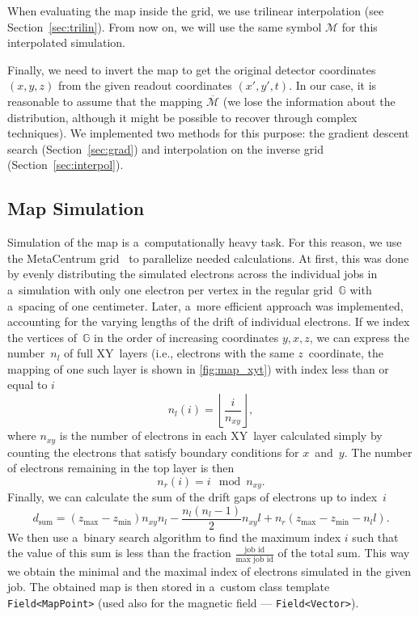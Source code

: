 		When evaluating the map inside the grid, we use trilinear interpolation (see Section~\ref{sec:trilin}). From now on, we will use the same symbol $\mathcal{M}$ for this interpolated simulation.
		
		Finally, we need to invert the map to get the original detector coordinates $(x,y,z)$ from the given readout coordinates $(x',y',t)$. In our case, it is reasonable to assume that the mapping $\overline{\mathcal{M}}$ (we lose the information about the distribution, although it might be possible to recover through complex techniques). We implemented two methods for this purpose: the gradient descent search (Section~\ref{sec:grad}) and interpolation on the inverse grid (Section~\ref{sec:interpol}).
		
		\subsection{Map Simulation}
			Simulation of the map is a~computationally heavy task. For this reason, we use the MetaCentrum grid~\cite{metacentrum} to parallelize needed calculations. At first, this was done by evenly distributing the simulated electrons across the individual jobs in a~simulation with only one electron per vertex in the regular grid~$\mathbb{G}$ with a~spacing of one centimeter. Later, a~more efficient approach was implemented, accounting for the varying lengths of the drift of individual electrons. If we index the vertices of~$\mathbb{G}$ in the order of increasing coordinates $y,x,z$, we can express the number~$n_l$ of full XY~layers (i.e., electrons with the same $z$~coordinate, the mapping of one such layer is shown in \cref{fig:map_xyt}) with index less than or equal to $i$
				\begin{equation}
					n_l(i) = \left\lfloor\frac{i}{n_{xy}}\right\rfloor,
				\end{equation}
			where $n_{xy}$ is the number of electrons in each XY~layer calculated simply by counting the electrons that satisfy boundary conditions for $x$~and~$y$. The number of electrons remaining in the top layer is then
				\begin{equation}
					n_r(i) = i\!\!\!\!\mod n_{xy}.
				\end{equation}
			Finally, we can calculate the sum of the drift gaps of electrons up to index~$i$
				\begin{equation}
					d_\text{sum} = (z_\text{max}-z_\text{min})n_{xy}n_l-\frac{n_l(n_l-1)}{2}n_{xy}l+n_r(z_\text{max}-z_\text{min}-n_l l).
				\end{equation}
			We then use a~binary search algorithm to find the maximum index $i$ such that the value of this sum is less than the fraction $\frac{\text{job id}}{\text{max job id}}$ of the total sum. This way we obtain the minimal and the maximal index of electrons simulated in the given job. The obtained map is then stored in a~custom class template \texttt{Field<MapPoint>} (used also for the magnetic field --- \texttt{Field<Vector>}).
		

